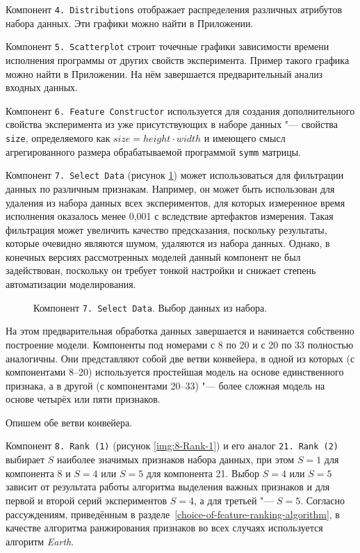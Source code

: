 Компонент \texttt{4.\,Distributions} отображает распределения различных атрибутов набора данных. Эти графики можно найти в Приложении.

Компонент \texttt{5.\,Scatterplot} строит точечные графики зависимости времени исполнения программы от других свойств эксперимента. Пример такого графика можно найти в Приложении. На нём завершается предварительный анализ входных данных.

Компонент \texttt{6.\,Feature Constructor} используется для создания дополнительного свойства эксперимента из уже присутствующих в наборе данных "--- свойства \texttt{size}, определяемого как $size = height \cdot width$ и имеющего смысл агрегированного размера обрабатываемой программой \texttt{symm} матрицы.

Компонент \texttt{7.\,Select~Data} (рисунок \ref{img:7-Select-Data}) может использоваться для фильтрации данных по различным признакам. Например, он может быть использован для удаления из набора данных всех экспериментов, для которых измеренное время исполнения оказалось менее 0,001 с вследствие артефактов измерения. Такая фильтрация может увеличить качество предсказания, поскольку результаты, которые очевидно являются шумом, удаляются из набора данных. Однако, в конечных версиях рассмотренных моделей данный компонент не был задействован, поскольку он требует тонкой настройки и снижает степень автоматизации моделирования.

\begin{figure}[H]
    \caption{Компонент \texttt{7.\,Select~Data}. Выбор данных из набора.}
    \label{img:7-Select-Data}
\end{figure}

На этом предварительная обработка данных завершается и начинается собственно построение модели. Компоненты под номерами с 8 по 20 и с 20 по 33 полностью аналогичны. Они представляют собой две ветви конвейера, в одной из которых (с компонентами 8--20) используется простейшая модель на основе единственного признака, а в другой (с компонентами 20--33) "--- более сложная модель на основе четырёх или пяти признаков.

Опишем обе ветви конвейера.

Компонент \texttt{8.\,Rank~(1)} (рисунок \ref{img:8-Rank-1}) и его аналог \texttt{21.\,Rank~(2)}  выбирает $S$ наиболее значимых признаков набора данных, при этом $S = 1$ для компонента 8 и $S = 4$ или $S = 5$ для компонента 21. Выбор $S = 4$ или $S = 5$ зависит от результата работы алгоритма выделения важных признаков и для первой и второй серий экспериментов $S = 4$, а для третьей "--- $S = 5$. Согласно рассуждениям, приведённым в разделе~\ref{choice-of-feature-ranking-algorithm}, в качестве алгоритма ранжирования признаков во всех случаях используется алгоритм \textit{Earth}.

